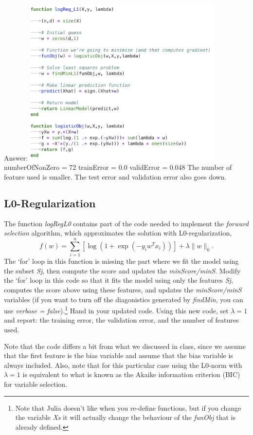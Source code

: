 \documentclass{article}
\def\ans#1{\par\gre{Answer: #1}}
\def\blu#1{{\color{blu}#1}}
\def\gre#1{{\color{gre}#1}}
\def\norm#1{\|#1\|}
\begin{document}
 \ans{ \includegraphics[width=10cm]{Q23.png}
     numberOfNonZero = 72
 trainError = 0.0
 validError = 0.048
 The number of feature used is smaller. The test error and validation error also goes down.
 }


\subsection{L0-Regularization}

The function \emph{logRegL0} contains part of the code needed to implement the \emph{forward selection} algorithm, which approximates the solution with L0-regularization,
\[
f(w) =  \sum_{i=1}^n \left[\log(1+\exp(-y_iw^Tx_i))\right] + \lambda\norm{w}_0.
\]
The `for' loop in this function is missing the part where we fit the model using the subset \emph{Sj}, then compute the score and updates the \emph{minScore/minS}. Modify the `for' loop in this code so that it fits the model using only the features \emph{Sj}, computes the score above using these features, and updates the \emph{minScore/minS} variables (if you want to turn off the diagonistics generated by \emph{findMin}, you can use \emph{verbose = false}).\footnote{Note that Julia doesn't like when you re-define functions, but if you change the variable \emph{Xs} it will actually change the behaviour of the \emph{funObj} that is already defined.}
\blu{Hand in your updated code. Using this new code, set $\lambda = 1$ and report: the training error, the validation error, and the number of features used.}

Note that the code differs a bit from what we discussed in class, since we assume that the first feature is the bias variable and assume that the bias variable is always included. Also, note that for this particular case using the L0-norm with $\lambda=1$ is equivalent to what is known as the Akaike information criterion (BIC) for variable selection.
\end{document}
